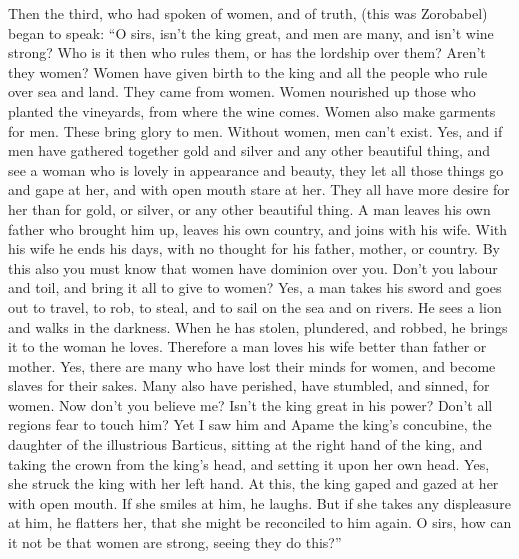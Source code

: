  Then the third, who had spoken of women, and of truth,
(this was Zorobabel) began to speak:  ``O sirs, isn't the
king great, and men are many, and isn't wine strong? Who is it then who
rules them, or has the lordship over them? Aren't they women?
 Women have given birth to the king and all the people who
rule over sea and land.  They came from women. Women
nourished up those who planted the vineyards, from where the wine comes.
 Women also make garments for men. These bring glory to
men. Without women, men can't exist.  Yes, and if men have
gathered together gold and silver and any other beautiful thing, and see
a woman who is lovely in appearance and beauty,  they let
all those things go and gape at her, and with open mouth stare at her.
They all have more desire for her than for gold, or silver, or any other
beautiful thing.  A man leaves his own father who brought
him up, leaves his own country, and joins with his wife. 
With his wife he ends his days, with no thought for his father, mother,
or country.  By this also you must know that women have
dominion over you. Don't you labour and toil, and bring it all to give
to women?  Yes, a man takes his sword and goes out to
travel, to rob, to steal, and to sail on the sea and on rivers.
 He sees a lion and walks in the darkness. When he has
stolen, plundered, and robbed, he brings it to the woman he loves.
 Therefore a man loves his wife better than father or
mother.  Yes, there are many who have lost their minds for
women, and become slaves for their sakes.  Many also have
perished, have stumbled, and sinned, for women.  Now don't
you believe me? Isn't the king great in his power? Don't all regions
fear to touch him?  Yet I saw him and Apame the king's
concubine, the daughter of the illustrious Barticus, sitting at the
right hand of the king,  and taking the crown from the
king's head, and setting it upon her own head. Yes, she struck the king
with her left hand.  At this, the king gaped and gazed at
her with open mouth. If she smiles at him, he laughs. But if she takes
any displeasure at him, he flatters her, that she might be reconciled to
him again.  O sirs, how can it not be that women are
strong, seeing they do this?''

